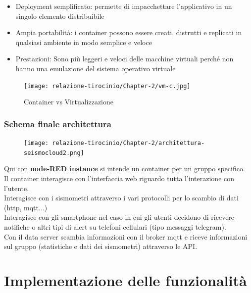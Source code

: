 \documentclass[a4paper,10pt]{memoir}
\begin{document}
\begin{itemize}
    \item Deployment semplificato: permette di impacchettare l'applicativo in un singolo elemento distribuibile
    \item Ampia portabilità: i container possono essere creati, distrutti e replicati in qualsiasi ambiente in modo semplice e veloce
    \item Prestazioni: Sono più leggeri e veloci delle macchine virtuali perché non hanno una emulazione del sistema operativo virtuale
\end{itemize}

\begin{figure}[H]
\caption{Container vs Virtualizzazione}
\texttt{[image: relazione-tirocinio/Chapter-2/vm-c.jpg]}
\end{figure}

\clearpage

\subsection{Schema finale architettura}
\begin{figure}[H]
\texttt{[image: relazione-tirocinio/Chapter-2/architettura-seismocloud2.png]}
\end{figure}

\clearpage

Qui con \textbf{node-RED instance} si intende un container per un gruppo specifico.
\\
Il container interagisce con l'interfaccia web riguardo tutta l'interazione con l'utente.
\\
Interagisce con i sismometri attraverso i vari protocolli per lo scambio di dati (http, mqtt...)
\\
Interagisce con gli smartphone nel caso in cui gli utenti decidono di ricevere notifiche o altri tipi di alert su telefoni cellulari (tipo messaggi telegram).
\\
Con il data server scambia informazioni con il broker mqtt e riceve informazioni sul gruppo (statistiche e dati dei sismometri) attraverso le API.
\\
\clearpage


\chapter{Implementazione delle funzionalità}
\end{document}
